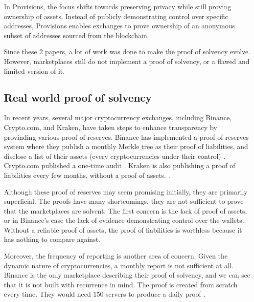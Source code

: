 In Provisions, the focus shifts towards preserving privacy while still proving ownership of assets.
Instead of publicly demonstrating control over specific addresses, Provisions enables exchanges to prove ownership of an anonymous subset of addresses sourced from the blockchain.

Since these 2 papers, a lot of work was done to make the proof of solvency evolve. However, marketplaces still do not implement a proof of solvency, or a flawed and limited version of it.


\subsection{Real world proof of solvency}
In recent years, several major cryptocurrency exchanges, including Binance, Crypto.com, and Kraken, have taken steps to enhance transparency by provinding various proof of reserves.
Binance has implemented a proof of reserves system where they publish a monthly Merkle tree as their proof of liabilities, and disclose a list of their assets (every cryptocurrencies under their control) \cite{BPR}.
Crypto.com published a one-time audit \cite{CC22}.
Kraken is also publishing a proof of liabilities every few months, without a proof of assets. \cite{KK23}.

Although these proof of reserves may seem promising initially, they are primarily superficial.
The proofs have many shortcomings, they are not sufficient to prove that the marketplaces are solvent.
The first concern is the lack of proof of assets, or in Binance's case the lack of evidence demonstrating control over the wallets.
Without a reliable proof of assets, the proof of liabilities is worthless because it has nothing to compare against.

Moreover, the frequency of reporting is another area of concern. Given the dynamic nature of cryptocurrencies, a monthly report is not sufficient at all.
Binance is the only marketplace describing their proof of solvency, and we can see that it is not built with recurrence in mind.
The proof is created from scratch every time. They would need 150 servers to produce a daily proof \cite{BPS}.

















